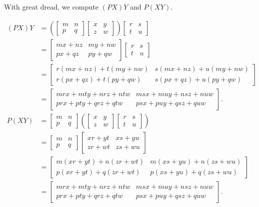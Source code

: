\documentclass[../key.tex]{subfiles}
\begin{document}
With great dread, we compute $(PX)Y$ and $P(XY)$.

\begin{align*}
(PX)Y &= \left(\begin{bmatrix} m & n \\ p & q \end{bmatrix}\begin{bmatrix} x & y \\ z & w \end{bmatrix}\right)\begin{bmatrix} r & s \\ t & u \end{bmatrix} \\
&= \begin{bmatrix} mx + nz & my + nw \\ px + qz & py + qw \end{bmatrix} \begin{bmatrix} r & s \\ t & u \end{bmatrix} \\
&= \begin{bmatrix} r(mx+nz)+t(my+nw) & s(mx+nz) + u(my+nw) \\ r(px+qz) + t(py+qw) & s(px+qz) + u(py+qw)\end{bmatrix} \\
&= \begin{bmatrix} mrx+mty+nrz+ntw & msx+muy+nsz+nuw \\ prx+pty+qrz+qtw & psx+puy+qsz+quw \end{bmatrix}. \\
P(XY) &= \begin{bmatrix} m & n \\ p & q \end{bmatrix}\left(\begin{bmatrix} x & y \\ z & w \end{bmatrix}\begin{bmatrix} r & s \\ t & u \end{bmatrix}\right) \\
&= \begin{bmatrix} m & n \\ p & q \end{bmatrix}\begin{bmatrix}xr + yt & xs + yu \\ zr + wt & zs + wu \end{bmatrix} \\
&= \begin{bmatrix} m(xr+yt) + n(zr+wt) & m(xs+yu) + n(zs+wu) \\ p(xr+yt) + q(zr+wt) & p(xs+yu) + q(zs+wu) \end{bmatrix} \\
&= \begin{bmatrix} mrx+mty+nrz+ntw & msx+muy+nsz+nuw \\ prx+pty+qrz+qtw & psx+puy+qsz+quw \end{bmatrix}.
\end{align*}
\end{document}
